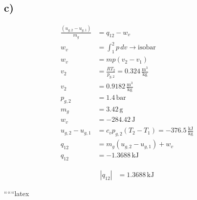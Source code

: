 

\subsection*{c)}

\begin{align*}
\frac{(u_{g,2} - u_{g,1})}{m_g} &= q_{12} - w_v \\
w_v &= \int_{1}^{2} p \, dv \rightarrow \text{isobar} \\
w_v &= mp(v_2 - v_1) \\
v_2 &= \frac{RT_2}{p_{g,2}} = 0.324 \, \frac{\text{m}^3}{\text{kg}} \\
v_2 &= 0.9182 \, \frac{\text{m}^3}{\text{kg}} \\
p_{g,2} &= 1.4 \, \text{bar} \\
m_g &= 3.42 \, \text{g} \\
w_v &= -284.42 \, \text{J} \\
u_{g,2} - u_{g,1} &= c_v p_{g,2} (T_2 - T_1) = -376.5 \, \frac{\text{kJ}}{\text{kg}} \\
q_{12} &= m_g (u_{g,2} - u_{g,1}) + w_v \\
q_{12} &= -1.3688 \, \text{kJ}
\end{align*}

\begin{align*}
|q_{12}| &= 1.3688 \, \text{kJ}
\end{align*}

``````latex